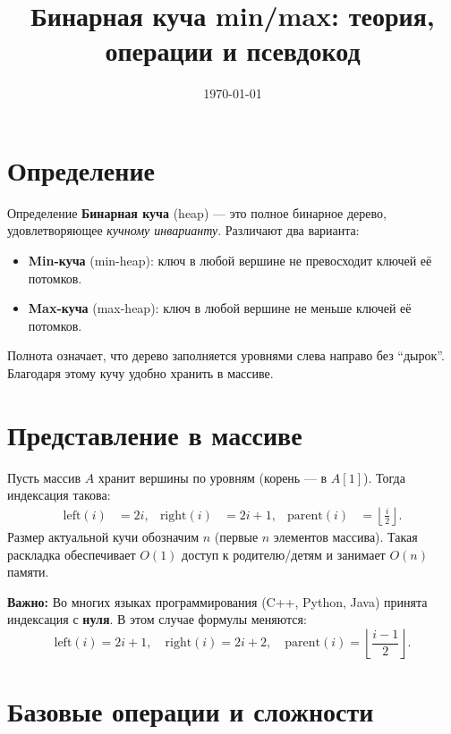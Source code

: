 \documentclass[12pt,a4paper]{article}
\title{Бинарная куча min/max: теория, операции и псевдокод}
\author{}
\date{\today}
\begin{document}
\maketitle

\tableofcontents
\vspace{1cm}

\section{Определение}

\begin{defbox}{Определение}
\textbf{Бинарная куча} (heap) --- это полное бинарное дерево, удовлетворяющее \emph{кучному инварианту}. Различают два варианта:
\begin{itemize}[noitemsep, topsep=2pt]
  \item \textbf{Min-куча} (min-heap): ключ в любой вершине не превосходит ключей её потомков.
  \item \textbf{Max-куча} (max-heap): ключ в любой вершине не меньше ключей её потомков.
\end{itemize}
\end{defbox}

Полнота означает, что дерево заполняется уровнями слева направо без ``дырок''. Благодаря этому кучу удобно хранить в массиве.

\section{Представление в массиве}

Пусть массив $A$ хранит вершины по уровням (корень --- в $A[1]$). Тогда индексация такова:
\begin{align*}
\text{left}(i) &= 2i, & \text{right}(i) &= 2i + 1, & \text{parent}(i) &= \left\lfloor \frac{i}{2} \right\rfloor.
\end{align*}
Размер актуальной кучи обозначим $n$ (первые $n$ элементов массива). Такая раскладка обеспечивает $O(1)$ доступ к родителю/детям и занимает $O(n)$ памяти.

\begin{notebox}
\textbf{Важно:} Во многих языках программирования (C++, Python, Java) принята индексация с \textbf{нуля}. В этом случае формулы меняются:
\[
\text{left}(i) = 2i + 1, \quad \text{right}(i) = 2i + 2, \quad \text{parent}(i) = \left\lfloor \frac{i-1}{2} \right\rfloor.
\]
\end{notebox}

\section{Базовые операции и сложности}
\end{document}
